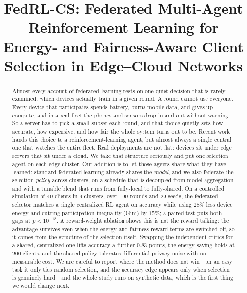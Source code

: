 \documentclass[conference]{IEEEtran}
\begin{document}
\title{FedRL-CS: Federated Multi-Agent Reinforcement Learning for\\
Energy- and Fairness-Aware Client Selection in Edge--Cloud Networks}

\author{
}

\maketitle

\begin{abstract}
Almost every account of federated learning rests on one quiet decision that is
rarely examined: which devices actually train in a given round. A round cannot
use everyone. Every device that participates spends battery, burns mobile data,
and gives up compute, and in a real fleet the phones and sensors drop in and out
without warning. So a server has to pick a small subset each round, and that
choice quietly sets how accurate, how expensive, and how fair the whole system
turns out to be. Recent work hands this choice to a reinforcement-learning agent,
but almost always a single central one that watches the entire fleet. Real
deployments are not flat: devices sit under edge servers that sit under a cloud.
We take that structure seriously and put one selection agent on each edge
cluster. Our addition is to let those agents share what they have learned:
standard federated learning already shares the \emph{model}, and we also federate
the selection \emph{policy} across clusters, on a schedule that is decoupled from
model aggregation and with a tunable blend that runs from fully-local to
fully-shared. On a controlled simulation of $40$ clients in $4$ clusters, over
$100$ rounds and $20$ seeds, the federated selector matches a single centralized
RL agent on accuracy while using $28\%$ less device energy and cutting
participation inequality (Gini) by $15\%$; a paired test puts both gaps at
$p<10^{-18}$. A reward-weight ablation shows this is not the reward talking: the
advantage survives even when the energy and fairness reward terms are switched
off, so it comes from the structure of the selection itself. Swapping the
independent critics for a shared, centralized one lifts accuracy a further
$0.83$ points, the energy saving holds at $200$ clients, and the shared policy
tolerates differential-privacy noise with no measurable cost. We are careful to
report where the method does not win---on an easy task it only ties random
selection, and the accuracy edge appears only when selection is genuinely
hard---and the whole study runs on synthetic data, which is the first thing we
would change next.
\end{abstract}
\end{document}
